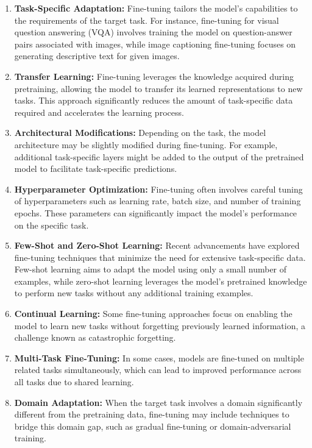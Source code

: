 \begin{enumerate}
    \item \textbf{Task-Specific Adaptation:} Fine-tuning tailors the model's capabilities to the requirements of the target task. For instance, fine-tuning for visual question answering (VQA) involves training the model on question-answer pairs associated with images, while image captioning fine-tuning focuses on generating descriptive text for given images.
    \item \textbf{Transfer Learning:} Fine-tuning leverages the knowledge acquired during pretraining, allowing the model to transfer its learned representations to new tasks. This approach significantly reduces the amount of task-specific data required and accelerates the learning process.
    \item \textbf{Architectural Modifications:} Depending on the task, the model architecture may be slightly modified during fine-tuning. For example, additional task-specific layers might be added to the output of the pretrained model to facilitate task-specific predictions.
    \item \textbf{Hyperparameter Optimization:} Fine-tuning often involves careful tuning of hyperparameters such as learning rate, batch size, and number of training epochs. These parameters can significantly impact the model's performance on the specific task.
    \item \textbf{Few-Shot and Zero-Shot Learning:} Recent advancements have explored fine-tuning techniques that minimize the need for extensive task-specific data. Few-shot learning aims to adapt the model using only a small number of examples, while zero-shot learning leverages the model's pretrained knowledge to perform new tasks without any additional training examples.
    \item \textbf{Continual Learning:} Some fine-tuning approaches focus on enabling the model to learn new tasks without forgetting previously learned information, a challenge known as catastrophic forgetting.
    \item \textbf{Multi-Task Fine-Tuning:} In some cases, models are fine-tuned on multiple related tasks simultaneously, which can lead to improved performance across all tasks due to shared learning.
    \item \textbf{Domain Adaptation:} When the target task involves a domain significantly different from the pretraining data, fine-tuning may include techniques to bridge this domain gap, such as gradual fine-tuning or domain-adversarial training.
\end{enumerate}


